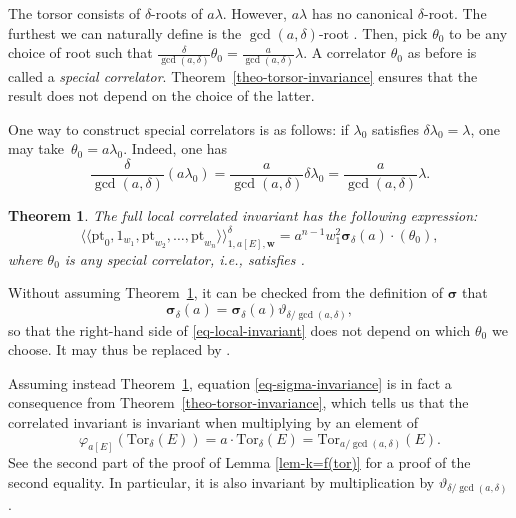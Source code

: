 \documentclass[pdftex]{sigma}
\newcommand{\Tor}{\mathrm{Tor}}
\newcommand{\pt}{\mathrm{pt}}
\newcommand{\bfw}{ {\boldsymbol w} }
\newcommand{\dfk}{\mathfrak{d}}
\numberwithin{equation}{section}
\newtheorem{theo}{Theorem}[section]
\theoremstyle{definition}
\begin{document}
The torsor consists of $\delta$-roots of $a\lambda$. However, $a\lambda$ has no canonical $\delta$-root. The furthest we can naturally define is the $\gcd(a,\delta)$-root . Then, pick $\theta_0$ to be any choice of root such that $\frac{\delta}{\gcd(a,\delta)}\theta_0 = \frac{a}{\gcd(a,\delta)}\lambda$. A correlator $\theta_0$ as before is called a \textit{special correlator}. Theorem~\ref{theo-torsor-invariance} ensures that the result does not depend on the choice of the latter.

One way to construct special correlators is as follows: if $\lambda_0$ satisfies $\delta\lambda_0=\lambda$, one may take~${\theta_0=a\lambda_0}$. Indeed, one has
\[ \frac{\delta}{\gcd(a,\delta)}(a\lambda_0) = \frac{a}{\gcd(a,\delta)}\delta\lambda_0 = \frac{a}{\gcd(a,\delta)}\lambda. \]

\begin{theo}\label{theo-expression-local-correlated-invariant}
The full local correlated invariant has the following expression:
\begin{equation}\label{eq-local-invariant}
\langle\langle \pt_0,1_{w_1},\pt_{w_2},\dots,\pt_{w_n}\rangle\rangle^\delta_{1,a[E],\bfw} = a^{n-1}w_1^2 \boldsymbol{\sigma}_\delta(a)
\cdot (\theta_0),
\end{equation}
where $\theta_0$ is any special correlator, i.e., satisfies .
\end{theo}

Without assuming Theorem~\ref{theo-expression-local-correlated-invariant}, it can be checked from the definition of $\boldsymbol{\sigma}$ that
\begin{equation}\label{eq-sigma-invariance}
 \boldsymbol{\sigma}_\delta(a) = \boldsymbol{\sigma}_\delta(a)\vartheta_{\delta/\gcd(a,\delta)},
\end{equation}
so that the right-hand side of \eqref{eq-local-invariant} does not depend on which $\theta_0$ we choose. It may thus be replaced by \smash{$\vartheta_{\delta/\gcd(a,\delta)}\cdot(\theta_0)=\dfk\big[\frac{1}{\delta/\gcd(a,\delta)}\big]\bigl(\frac{a}{\gcd(a,\delta)}\lambda\bigr)$}.

Assuming instead Theorem~\ref{theo-expression-local-correlated-invariant}, equation \eqref{eq-sigma-invariance} is in fact a consequence from Theorem~\ref{theo-torsor-invariance}, which tells us that the correlated invariant is invariant when multiplying by an element of \[\varphi_{a[E]}(\Tor_\delta(E))=a\cdot\Tor_\delta(E)=\Tor_{a/\gcd(a,\delta)}(E).\]
See the second part of the proof of Lemma \ref{lem-k=f(tor)} for a proof of the second equality. In particular, it is also invariant by multiplication by $\vartheta_{\delta/\gcd(a,\delta)}$.
\end{document}
